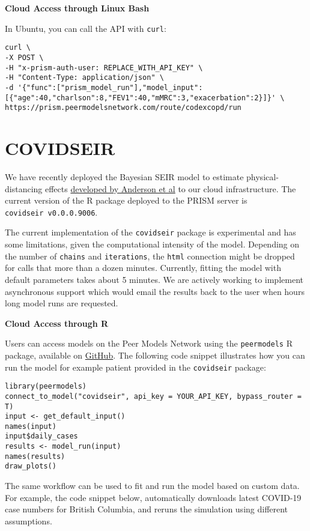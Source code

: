 \documentclass[
]{book}
\begin{document}
\textbf{Cloud Access through Linux Bash}

In Ubuntu, you can call the API with \texttt{curl}:

\begin{verbatim}
curl \
-X POST \
-H "x-prism-auth-user: REPLACE_WITH_API_KEY" \
-H "Content-Type: application/json" \
-d '{"func":["prism_model_run"],"model_input":[{"age":40,"charlson":8,"FEV1":40,"mMRC":3,"exacerbation":2}]}' \
https://prism.peermodelsnetwork.com/route/codexcopd/run
\end{verbatim}

\hypertarget{covidseir-1}{%
\section{COVIDSEIR}\label{covidseir-1}}

We have recently deployed the Bayesian SEIR model to estimate physical-distancing effects \href{https://doi.org/10.1101/2020.04.17.20070086}{developed by Anderson et al} to our cloud infrastructure. The current version of the R package deployed to the PRISM server is \texttt{covidseir\ v0.0.0.9006}.

The current implementation of the \texttt{covidseir} package is experimental and has some limitations, given the computational intensity of the model. Depending on the number of \texttt{chains} and \texttt{iterations}, the \texttt{html} connection might be dropped for calls that more than a dozen minutes.
Currently, fitting the model with default parameters takes about 5 minutes. We are actively working to implement asynchronous support which would email the results back to the user when hours long model runs are requested.

\textbf{Cloud Access through R}

Users can access models on the Peer Models Network using the \texttt{peermodels} R package, available on \href{https://github.com/resplab/peermodels}{GitHub}. The following code snippet illustrates how you can run the model for example patient provided in the \texttt{covidseir} package:

\begin{verbatim}
library(peermodels)
connect_to_model("covidseir", api_key = YOUR_API_KEY, bypass_router = T)
input <- get_default_input()
names(input)
input$daily_cases
results <- model_run(input)
names(results)
draw_plots()
\end{verbatim}

The same workflow can be used to fit and run the model based on custom data. For example, the code snippet below, automatically downloads latest COVID-19 case numbers for British Columbia, and reruns the simulation using different assumptions.
\end{document}
